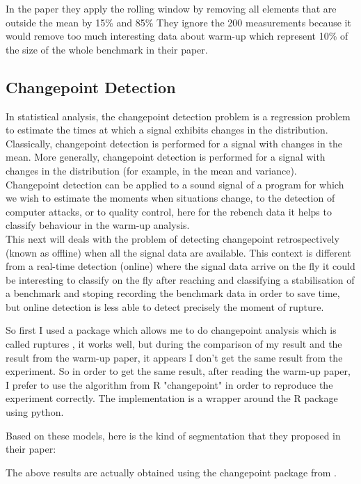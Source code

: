 \documentclass{article}
\begin{document}
In the paper they apply the rolling window by removing all elements that are outside the mean by 15\% and 85\% They ignore the 200 measurements because it would remove too much interesting data about warm-up which represent 10\% of the size of the whole benchmark in their paper.


\subsection{Changepoint Detection}
In statistical analysis,  the changepoint detection problem is a regression problem to estimate the times at which a signal exhibits changes in the distribution. Classically, changepoint detection is performed for a signal with changes in the mean. More generally, changepoint detection is performed for a signal with changes in the distribution (for example, in the mean and variance). \\

Changepoint detection can be applied to a sound signal of a program for which we wish to estimate the moments when situations change, to the detection of computer attacks, or to quality control, here for the rebench data it helps to classify behaviour in the warm-up analysis. \\

This next will deals with the problem of detecting changepoint retrospectively (known as offline) when all the signal data are available. This context is different from a real-time detection (online) where the signal data arrive on the fly it could be interesting to classify on the fly after reaching and classifying a stabilisation of a benchmark and stoping recording the benchmark data in order to save time, but online detection is less able to detect precisely the moment of rupture.

So first I used a package which allows me to do changepoint analysis which is called ruptures \citep{truong2020selective}, it works well, but during the comparison of my result and the result from the warm-up paper, it appears I don't get the same result from the experiment. So in order to get the same result, after reading the warm-up paper, I prefer to use the algorithm from R "changepoint" \citep{killick2014changepoint} in order to reproduce the experiment correctly. The implementation is a wrapper around the R package using python. 

Based on these models, here is the kind of segmentation that they proposed in their paper:

The above results are actually obtained using the changepoint package from \citep{killick2014changepoint}.
\end{document}
